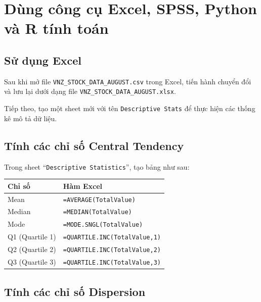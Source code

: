 \newpage
\section{Dùng công cụ Excel, SPSS, Python và R tính toán}

\subsection{Sử dụng Excel}
Sau khi mở file \texttt{VNZ\_STOCK\_DATA\_AUGUST.csv} trong Excel, 
tiến hành chuyển đổi và lưu lại dưới dạng file 
\texttt{VNZ\_STOCK\_DATA\_AUGUST.xlsx}.  

Tiếp theo, tạo một sheet mới với tên \texttt{Descriptive Stats} để thực hiện 
các thống kê mô tả dữ liệu.
\subsection*{Tính các chỉ số Central Tendency}

Trong sheet ``\texttt{Descriptive Statistics}'', tạo bảng như sau:

\begin{center}
\begin{tabular}{|l|l|}
\hline
\textbf{Chỉ số} & \textbf{Hàm Excel} \\
\hline
Mean              & \texttt{=AVERAGE(TotalValue)}          \\ \hline
Median            & \texttt{=MEDIAN(TotalValue)}           \\ \hline
Mode              & \texttt{=MODE.SNGL(TotalValue)}        \\ \hline
Q1 (Quartile 1)   & \texttt{=QUARTILE.INC(TotalValue,1)}   \\ \hline
Q2 (Quartile 2)   & \texttt{=QUARTILE.INC(TotalValue,2)}   \\ \hline
Q3 (Quartile 3)   & \texttt{=QUARTILE.INC(TotalValue,3)}   \\ \hline
\end{tabular}
\end{center}

\subsection*{Tính các chỉ số Dispersion}

